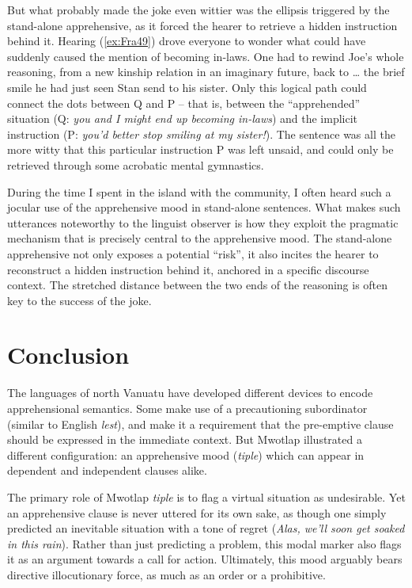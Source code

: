 \documentclass[output=paper,colorlinks,citecolor=brown]{langscibook}
\begin{document}
But what probably made the joke even wittier was the ellipsis triggered by the stand-alone apprehensive, as it forced the hearer to retrieve a hidden instruction behind it. Hearing (\ref{ex:Fra49}) drove everyone to wonder what could have suddenly caused the mention of becoming in-laws. One had to rewind Joe's whole reasoning, from a new kinship relation in an imaginary future, back to {\ldots} the brief smile he had just seen Stan send to his sister. Only this logical path could connect the dots between Q and P -- that is, between the ``apprehended'' situation (Q: \textit{you and I might end up becoming in-laws}) and the implicit instruction (P: \textit{you'd better stop smiling at my sister!}). The sentence was all the more witty that this particular instruction P was left unsaid, and could only be retrieved through some acrobatic mental gymnastics.


During the time I spent in the island with the community, I often heard such a jocular use of the apprehensive mood in stand-alone sentences. What makes such utterances noteworthy to the linguist observer is how they exploit the pragmatic mechanism that is precisely central to the apprehensive mood. The stand-alone apprehensive not only exposes a potential ``risk'', it also incites the hearer to reconstruct a hidden instruction behind it, anchored in a specific discourse context. The stretched distance between the two ends of the reasoning is often key to the success of the joke.


\section{Conclusion}
 
The languages of north Vanuatu have developed different devices to encode appre\-hen\-sional semantics. Some make use of a precautioning subordinator (simi\-lar to English \textit{lest}), and make it a requirement that the pre-emptive clause should be expressed in the immediate context. But Mwotlap illustrated a different configuration: an apprehensive mood (\textit{tiple}) which can appear in dependent and independent clauses alike.


The primary role of Mwotlap  \textit{tiple} is to flag a virtual situation as undesirable. Yet an apprehensive clause is never uttered for its own sake, as though one simply predicted an inevitable situation with a tone of regret (\textit{Alas, we'll soon get soaked in this rain}). Rather than just predicting a problem, this modal marker also flags it as an argument towards a call for action. Ultimately, this mood arguably bears directive illocutionary force, as much as an order or a prohibitive.
\end{document}
